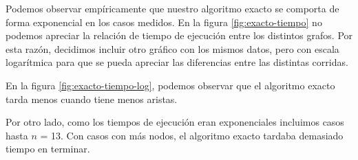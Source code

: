 Podemos observar empíricamente que nuestro algoritmo exacto se comporta de forma exponencial en los casos medidos. En la figura \ref{fig:exacto-tiempo} no podemos apreciar la relación de tiempo de ejecución entre los distintos grafos. Por esta razón, decidimos incluir otro gráfico con los mismos datos, pero con escala logarítmica para que se pueda apreciar las diferencias entre las distintas corridas.

En la figura \ref{fig:exacto-tiempo-log}, podemos observar que el algoritmo exacto tarda menos cuando tiene menos aristas.	

Por otro lado, como los tiempos de ejecución eran exponenciales incluimos casos hasta $n$ = 13. Con casos con más nodos, el algoritmo exacto tardaba demasiado tiempo en terminar.